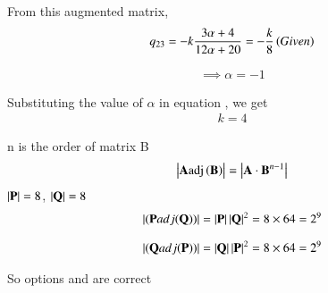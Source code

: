 \documentclass[journal]{IEEEtran}
\begin{document}
From this augmented matrix,
\begin{align}
q_{23} = -k\frac{3\alpha+4}{12\alpha+20} = -\frac{k}{8} \left(Given\right)
\end{align}

\begin{align}
\implies \alpha = -1
\end{align}


Substituting the value of $\alpha$ in equation , we get
\begin{align}
k = 4
\end{align}

n is the order of matrix B
\begin{align}
\left\vert{\mathbf{A}\mathrm{adj}\ensuremath{\left(\mathbf{B}\right)}}\right\vert = \left\vert\mathbf{A}\cdot\mathbf{B}^{n-1}\right\vert
\end{align}
$\left\vert\mathbf{P}\right\vert = 8$, $\left\vert\mathbf{Q}\right\vert = 8$
\begin{align}
\left\vert{(\mathbf{P} adj(\mathbf{Q}))}\right\vert = \left\vert\mathbf{P}\right\vert \left\vert\mathbf{Q}\right\vert^{2} = 8\times64 = 2^9
\end{align}

\begin{align}
\left\vert{(\mathbf{Q} adj(\mathbf{P}))}\right\vert = \left\vert\mathbf{Q}\right\vert \left\vert\mathbf{P}\right\vert^{2} = 8\times64 = 2^9 
\end{align}

So options  and  are correct
\end{document}
